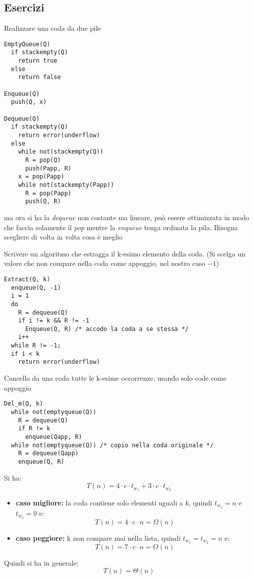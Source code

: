 \documentclass[a4paper,12pt,oneside,tikz]{book}
\begin{document}
\subsection{Esercizi}
\begin{esercizio}
Realizzare una coda da due pile 
\begin{verbatim}
EmptyQueue(Q)
  if stackempty(Q)
    return true
  else
    return false
    
Enqueue(Q)
  push(Q, x)
  
Dequeue(Q)
  if stackempty(Q)
    return error(underflow)
  else
    while not(stackempty(Q))
      R = pop(Q)
      push(Papp, R)
    x = pop(Papp)
    while not(stackempty(Papp))
      R = pop(Papp)
      push(Q, R)
\end{verbatim}
ma ora si ha la \textit{dequeue} non costante ma lineare, può essere ottimizzata in modo che faccia solamente il \textit{pop} mentre la \textit{enqueue} tenga ordinata la pila. Bisogna scegliere di volta in volta cosa è meglio
\end{esercizio}
\newpage
\begin{esercizio}
Scrivere un algoritmo che estragga il k-esimo elemento della coda. (Si scelga un valore che non compare nella coda come appoggio, nel nostro caso $-1$)
\begin{verbatim}
Extract(Q, k)
  enqueue(Q, -1)
  i = 1
  do
    R = dequeue(Q) 
    if i != k && R != -1
      Enqueue(Q, R) /* accodo la coda a se stessa */
    i++
  while R != -1;
  if i < k
    return error(underflow)
\end{verbatim}
\end{esercizio}
\begin{esercizio}
Cancello da una coda tutte le k-esime occorrenze, usando solo code come appoggio
\begin{verbatim}
Del_m(Q, k)
  while not(emptyqueue(Q))
    R = dequeue(Q)
    if R != k
      enqueue(Qapp, R)
  while not(emptyqueue(Q)) /* copio nella coda originale */
    R = dequeue(Qapp)
    enqueue(Q, R)
\end{verbatim}
Si ha:
$$T(n)=4\cdot c\cdot t_{w_1}+3\cdot c\cdot t_{w_2}$$
\begin{itemize}
\item \textbf{caso migliore:} la coda contiene solo elementi uguali a $k$, quindi $t_{w_1}=n$ e $t_{w_2}=0$ e:
$$T(n)=4\cdot c\cdot n=\Omega(n)$$
\item \textbf{caso peggiore:} k non compare mai nella lista, quindi $t_{w_1}=t_{w_2}=n$ e:
$$T(n)=7\cdot c\cdot n=O(n)$$
\end{itemize}
Quindi si ha in generale:
$$T(n)=\Theta(n)$$
\end{esercizio}
\end{document}
